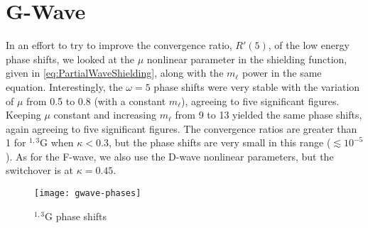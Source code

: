 \documentclass[Dissertation.tex]{subfiles}
\begin{document}
\section{G-Wave}
\label{sec:GWave}

In an effort to try to improve the convergence ratio, $R'(5)$,
of the low energy phase shifts, we
looked at the $\mu$ nonlinear parameter in the shielding function, given
in \cref{eq:PartialWaveShielding}, along with the $m_\ell$ power in the same
equation. Interestingly, the $\omega = 5$ phase shifts were very stable with
the variation of $\mu$ from 0.5 to 0.8 (with a constant $m_\ell$), agreeing to
five significant figures. Keeping $\mu$ constant and increasing $m_\ell$ from
9 to 13 yielded the same phase shifts, again agreeing to five significant
figures. The convergence ratios are greater than 1 for $^{1,3}$G when
$\kappa < 0.3$, but the phase shifts are very small in this range
($\lesssim 10^{-5}$). As for the F-wave, we also use the D-wave nonlinear
parameters, but the switchover is at $\kappa = 0.45$.


\begin{figure}
	\centering
	\texttt{[image: gwave-phases]}
	\caption{$^{1,3}$G phase shifts}
	\label{fig:GWavePhase}
\end{figure}

\end{document}
